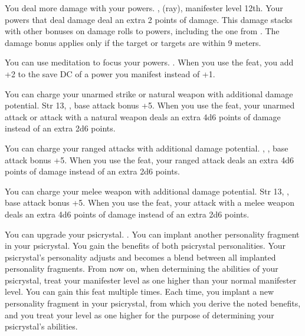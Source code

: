 
{You deal more damage with your powers.}
{,  (ray), manifester level 12th.}
{Your powers that deal damage deal an extra 2 points of damage. This damage stacks with other bonuses on damage rolls to powers, including the one from . The damage bonus applies only if the target or targets are within 9 meters.}
{}{}

{You can use meditation to focus your powers.}
{.}
{When you use the  feat, you add +2 to the save DC of a power you manifest instead of +1.}
{}{}

{You can charge your unarmed strike or natural weapon with additional damage potential.}
{Str 13, , base attack bonus +5.}
{When you use the  feat, your unarmed attack or attack with a natural weapon deals an extra 4d6 points of damage instead of an extra 2d6 points.}
{}{}

{You can charge your ranged attacks with additional damage potential.}
{, , base attack bonus +5.}
{When you use the  feat, your ranged attack deals an extra 4d6 points of damage instead of an extra 2d6 points.}
{}{}

{You can charge your melee weapon with additional damage potential.}
{Str 13, , base attack bonus +5.}
{When you use the  feat, your attack with a melee weapon deals an extra 4d6 points of damage instead of an extra 2d6 points.}
{}{}

{You can upgrade your psicrystal.}
{.}
{You can implant another personality fragment in your psicrystal. You gain the benefits of both psicrystal personalities. Your psicrystal's personality adjusts and becomes a blend between all implanted personality fragments. From now on, when determining the abilities of your psicrystal, treat your manifester level as one higher than your normal manifester level.}
{}
{You can gain this feat multiple times. Each time, you implant a new personality fragment in your psicrystal, from which you derive the noted benefits, and you treat your level as one higher for the purpose of determining your psicrystal's abilities.}

